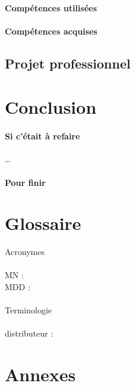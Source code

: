 \documentclass{rapportCS}
\begin{document}
\paragraph{Compétences utilisées}
\paragraph{Compétences acquises}
\subsection{Projet professionnel}

\newpage
\section{Conclusion}
\paragraph{Si c'était à refaire}
 \dots
\paragraph{Pour finir}

\newpage

\section{Glossaire}
\Large{Acronymes \\}
\\
\normalsize{
  MN : \\
  MDD : \\
} 
\\

\Large{Terminologie \\} 
\\
\normalsize{
  distributeur : \\
}


% 
\newpage
\section{Annexes}
\end{document}
